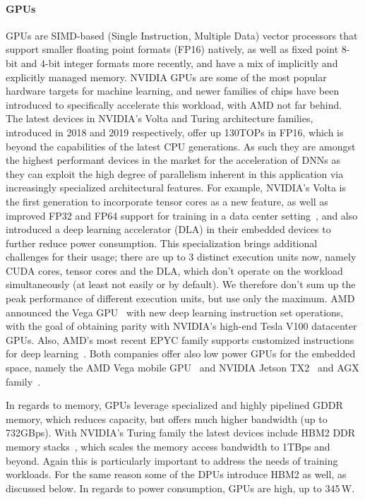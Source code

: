 \paragraph*{GPUs} GPUs are SIMD-based (Single Instruction, Multiple Data) vector processors that support smaller floating point formats (FP16) natively, as well as fixed point 8-bit and 4-bit integer formats more recently, and have a mix of implicitly and explicitly managed memory. 
NVIDIA GPUs are some of the most popular hardware targets for machine learning, and newer families of chips have been introduced to specifically accelerate this workload, with AMD not far behind. 
The latest devices in NVIDIA's Volta and Turing architecture families, introduced in 2018 and 2019 respectively, offer up 130TOPs in FP16, which is beyond the capabilities of the latest CPU generations. 
As such they are amongst the highest performant devices in the market for the acceleration of DNNs as they can exploit the high degree of parallelism inherent in this application via increasingly specialized architectural features.
For example, NVIDIA's Volta is the first generation to incorporate tensor cores as a new feature, as well as improved FP32 and FP64 support for training in a data center setting~\cite{NVIDIAv100}, and also introduced a deep learning accelerator (DLA) in their embedded devices to further reduce power consumption. This specialization brings additional challenges for their usage; there are up to 3 distinct execution units now, namely CUDA cores, tensor cores and the DLA, which don't operate on the workload simultaneously (at least not easily or by default). 
We therefore don't sum up the peak performance of different execution units, but use only the maximum.
AMD announced the Vega GPU~\cite{RadeonInstinctGPU} with new deep learning instruction set operations, with the goal of obtaining parity with NVIDIA's high-end Tesla V100 datacenter GPUs.  
Also, AMD's  most recent EPYC family supports customized instructions for deep learning~\cite{epyc}. 
Both companies offer also low power GPUs for the embedded space, namely the AMD Vega mobile GPU~\cite{radeon-mobile} and NVIDIA Jetson TX2~\cite{nvidia-jetson} and AGX family~\cite{agx}.

In regards to memory, GPUs leverage specialized and highly pipelined GDDR memory, which reduces capacity, but offers much higher bandwidth (up to 732GBps). With NVIDIA's Turing family the latest devices include HBM2 DDR memory stacks~\cite{turing}, which scales the memory access bandwidth to 1TBps and beyond. 
Again this is particularly important to address the needs of training workloads.
For the same reason some of the DPUs introduce HBM2 as well, as discussed below. 
In regards to power consumption, GPUs are high, up to 345\,W.

